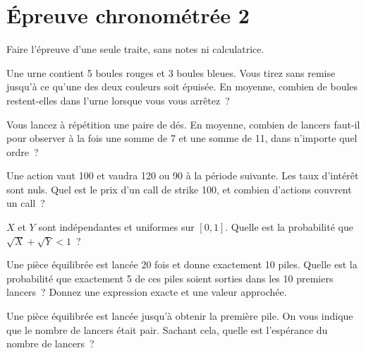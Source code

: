 \chapter{Épreuve chronométrée 2}\label{ch:iv1:timed-test-2}

\begin{ivtrains}
Faire l'épreuve d'une seule traite, sans notes ni calculatrice.
\end{ivtrains}


\begin{question}\label{iq:iv1:timed-test-2:1}
Une urne contient 5 boules rouges et 3 boules bleues. Vous tirez sans remise jusqu'à ce qu'une des deux couleurs soit épuisée. En moyenne, combien de boules restent-elles dans l'urne lorsque vous vous arrêtez~?
\end{question}

\begin{question}\label{iq:iv1:timed-test-2:2}
Vous lancez à répétition une paire de dés. En moyenne, combien de lancers faut-il pour observer à la fois une somme de 7 et une somme de 11, dans n'importe quel ordre~?
\end{question}

\begin{question}\label{iq:iv1:timed-test-2:3}
Une action vaut 100 et vaudra 120 ou 90 à la période suivante. Les taux d'intérêt sont nuls. Quel est le prix d'un call de strike 100, et combien d'actions couvrent un call~?
\end{question}

\begin{question}\label{iq:iv1:timed-test-2:4}
$X$ et $Y$ sont indépendantes et uniformes sur $[0, 1]$. Quelle est la probabilité que $\sqrt{X} + \sqrt{Y} < 1$~?
\end{question}

\begin{question}\label{iq:iv1:timed-test-2:5}
Une pièce équilibrée est lancée 20 fois et donne exactement 10 piles. Quelle est la probabilité que exactement 5 de ces piles soient sorties dans les 10 premiers lancers~? Donnez une expression exacte et une valeur approchée.
\end{question}

\begin{question}\label{iq:iv1:timed-test-2:6}
Une pièce équilibrée est lancée jusqu'à obtenir la première pile. On vous indique que le nombre de lancers était pair. Sachant cela, quelle est l'espérance du nombre de lancers~?
\end{question}

